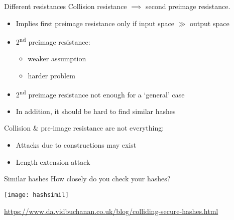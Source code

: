 \begin{frame}{Different resistances}
  Collision resistance $\implies$ second preimage resistance.
  \begin{itemize}[<+(1)->]
    \item Implies first preimage resistance only if input space $\gg$ output space
    \item 2\textsuperscript{nd} preimage resistance:
    \begin{itemize}
      \item weaker assumption
      \item harder problem
    \end{itemize}
    \item 2\textsuperscript{nd} preimage resistance not enough for a `general' case
    \item In addition, it should be hard to find similar hashes
  \end{itemize}

  \vspace*{1em}

  \pause
  Collision \& pre-image resistance are not everything:
  \begin{itemize}[<+(1)->]
    \item Attacks due to constructions may exist
    \item Length extension attack
  \end{itemize}
\end{frame}

\begin{frame}{Similar hashes}
  \pause
  How closely do you check your hashes?
  \begin{center}
    \texttt{[image: hashsimil]}
  \end{center}
  \vfill
  {\scriptsize\url{https://www.da.vidbuchanan.co.uk/blog/colliding-secure-hashes.html}}
\end{frame}

